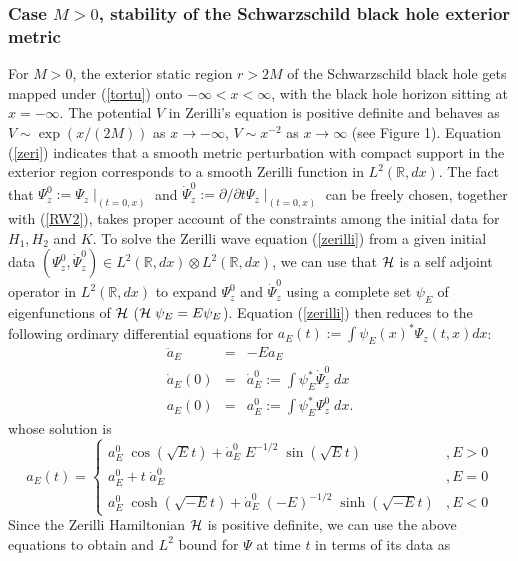 \documentclass[aps,floats,showpacs,amssymb,tightenlines]{revtex4}
\def\p{\partial}
\begin{document}
\subsubsection{Case $M>0$, stability of the Schwarzschild black hole exterior metric}
For $M>0$,
the exterior static region
$r>2M$ of the Schwarzschild black hole gets mapped under (\ref{tortu}) onto $-\infty < x< \infty$, with
the black hole horizon sitting at $x=-\infty$. The potential $V$ in Zerilli's equation is positive definite and behaves as
$V \sim \exp(x/(2M))$ as $x \to -\infty$, $V \sim x^{-2}$ as $x \to \infty$ (see Figure 1). Equation (\ref{zeri})
indicates that a smooth metric perturbation with compact support in the exterior region corresponds to a smooth
Zerilli function in  $L^2({\mathbb R},dx)$. The fact that $\Psi_z^0:=\Psi_z \mid_{(t=0,x)}$ and $\dot \Psi_z^0 := \p/\p t \Psi_z
\mid_{(t=0,x)}$
 can be freely
chosen, together with (\ref{RW2}),  takes proper  account of the constraints among the initial data for $H_1,H_2$ and $K$.
To solve the Zerilli wave equation (\ref{zerilli}) from a given initial data
$(\Psi_z^0, \dot \Psi_z^0) \in L^2({\mathbb R},dx) \otimes L^2({\mathbb R},dx)$, we can use
that ${\cal H}$ is a self adjoint operator in $L^2({\mathbb R},dx)$
to expand $\Psi_z^0$ and $\dot \Psi_z^0$
 using  a complete set $\psi_E$ of eigenfunctions of ${\cal H}$ (${\cal H} \; \psi_E = E \psi_E$).  Equation (\ref{zerilli})
 then reduces
 to  the following ordinary differential equations for $a_E(t) := \int \psi_E(x) ^* \Psi_z(t,x) dx$:
\begin{eqnarray}\nonumber
 \ddot a_E &=& -E a_E \\  \label{a1}
 \dot a_E(0) &=& \dot a_E^0 := \int \psi_E ^*  \dot \Psi_z^0 \; dx  \\
 a_E(0) &=& a_E^0 := \int \psi_E ^* \Psi_z^0 \; dx .  \nonumber
\end{eqnarray}
whose solution is
\begin{equation} \label{a3}
a_E(t) = \begin{cases} a_E^0 \; \cos (\sqrt{E} t) + \dot a_E^0 \; E^{-1/2} \; \sin(\sqrt{E} t) \ & , E>0\\
a_E^0 + t \; \dot a_E^0 &, E=0 \\
a_E^0 \; \cosh (\sqrt{-E} t) + \dot a_E^0 \; (-E)^{-1/2}\; \sinh(\sqrt{-E} t) & , E<0
\end{cases}
\end{equation}
Since the Zerilli Hamiltonian ${\cal H} $ is positive definite, we can use  the above equations to
obtain and $L^2$ bound for $\Psi$ at time $t$ in terms of its data \cite{wald} as
\end{document}
